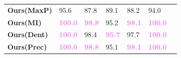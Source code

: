 \begin{table}[h]
\begin{center}
\begin{tabular}{lllllll}
              \textbf{Ours(MaxP)} & 95.6 & 87.8 &89.1 &  88.2 & 94.0 \\
              \textbf{Ours(MI)}& \textcolor{violet}{\textbf{100.0}} & \textcolor{violet}{\textbf{98.8}} & 95.2 &  \textcolor{violet}{\textbf{98.1}} & \textcolor{violet}{\textbf{100.0}} \\
              \textbf{Ours(Dent)}  & \textcolor{violet}{\textbf{100.0}} & 98.4 & \textcolor{violet}{\textbf{95.7}} &  97.7 & \textcolor{violet}{\textbf{100.0}} \\
            \textbf{Ours(Prec)}  & \textcolor{violet}{\textbf{100.0}} & \textcolor{violet}{\textbf{98.8}} & 95.1 &  \textcolor{violet}{\textbf{98.1}} & \textcolor{violet}{\textbf{100.0}} \\
    \toprule
  \end{tabular}
  \label{table:ablation-structure}
  \end{center}
  \vspace{-1.5em}
\end{table}
